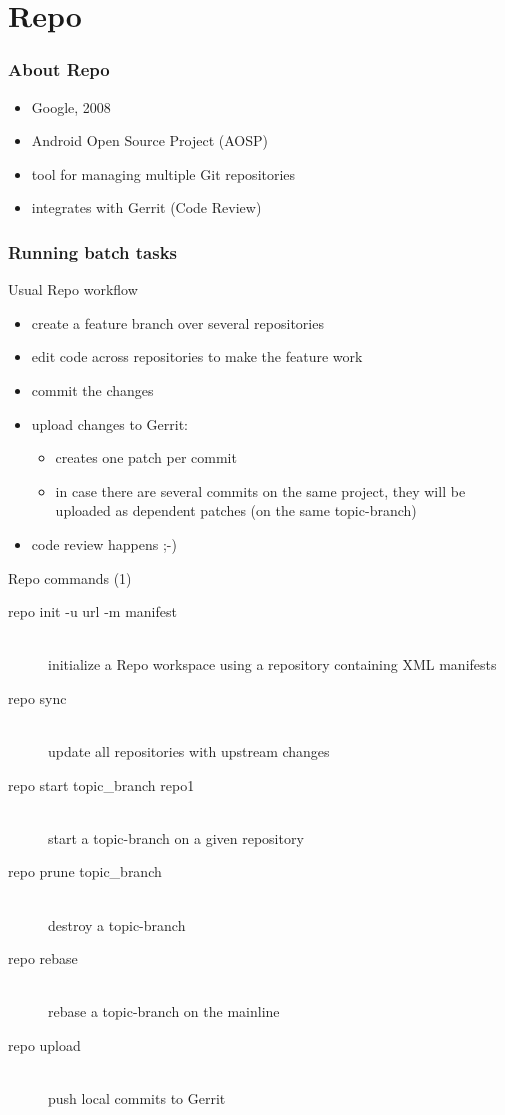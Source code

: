 \section{Repo}
\begin{frame}
  \frametitle{About Repo}
  
  \begin{itemize}
    \item Google, 2008
    \item Android Open Source Project (AOSP)
    \item tool for managing multiple Git repositories
    \item integrates with Gerrit (Code Review)
  \end{itemize}
\end{frame}

\begin{frame}
  \frametitle{Running batch tasks}

  Usual Repo workflow
  \begin{itemize}
    \item create a feature branch over several repositories
    \item edit code across repositories to make the feature work
    \item commit the changes
    \item upload changes to Gerrit:
      \begin{itemize}
        \item creates one patch per commit
        \item in case there are several commits on the same project, they will be
          uploaded as dependent patches (on the same topic-branch)
      \end{itemize}
    \item code review happens ;-)
  \end{itemize}
\end{frame}

\begin{frame}{Repo commands (1)}
  \begin{description}
    \item[repo init -u url -m manifest] \hfill \\
      initialize a Repo workspace using a repository containing XML manifests
    \item[repo sync] \hfill \\
      update all repositories with upstream changes
    \item[repo start topic\_branch repo1] \hfill \\
      start a topic-branch on a given repository
    \item[repo prune topic\_branch] \hfill \\
      destroy a topic-branch
    \item[repo rebase] \hfill \\
      rebase a topic-branch on the mainline
    \item[repo upload] \hfill \\
      push local commits to Gerrit
  \end{description}
\end{frame}

